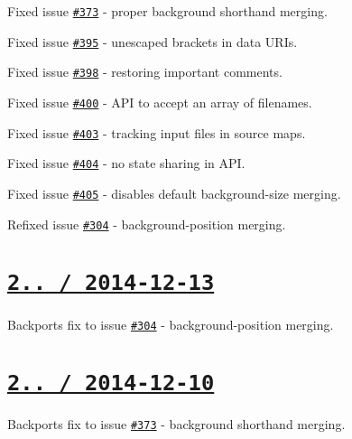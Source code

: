 \begin{DoxyItemize}
\item Fixed issue \href{https://github.com/jakubpawlowicz/clean-css/issues/373}{\tt \#373} -\/ proper {\ttfamily background} shorthand merging.
\item Fixed issue \href{https://github.com/jakubpawlowicz/clean-css/issues/395}{\tt \#395} -\/ unescaped brackets in data U\+R\+Is.
\item Fixed issue \href{https://github.com/jakubpawlowicz/clean-css/issues/398}{\tt \#398} -\/ restoring important comments.
\item Fixed issue \href{https://github.com/jakubpawlowicz/clean-css/issues/400}{\tt \#400} -\/ A\+PI to accept an array of filenames.
\item Fixed issue \href{https://github.com/jakubpawlowicz/clean-css/issues/403}{\tt \#403} -\/ tracking input files in source maps.
\item Fixed issue \href{https://github.com/jakubpawlowicz/clean-css/issues/404}{\tt \#404} -\/ no state sharing in A\+PI.
\item Fixed issue \href{https://github.com/jakubpawlowicz/clean-css/issues/405}{\tt \#405} -\/ disables default {\ttfamily background-\/size} merging.
\item Refixed issue \href{https://github.com/jakubpawlowicz/clean-css/issues/304}{\tt \#304} -\/ {\ttfamily background-\/position} merging.
\end{DoxyItemize}

\section*{\href{https://github.com/jakubpawlowicz/clean-css/compare/v2.2.21...v2.2.22}{\tt 2.. / 2014-\/12-\/13} }


\begin{DoxyItemize}
\item Backports fix to issue \href{https://github.com/jakubpawlowicz/clean-css/issues/304}{\tt \#304} -\/ {\ttfamily background-\/position} merging.
\end{DoxyItemize}

\section*{\href{https://github.com/jakubpawlowicz/clean-css/compare/v2.2.20...v2.2.21}{\tt 2.. / 2014-\/12-\/10} }


\begin{DoxyItemize}
\item Backports fix to issue \href{https://github.com/jakubpawlowicz/clean-css/issues/373}{\tt \#373} -\/ {\ttfamily background} shorthand merging.
\end{DoxyItemize}

